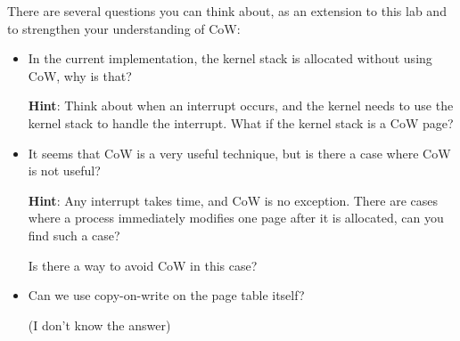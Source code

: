 There are several questions you can think about, as an extension to this lab and to
strengthen your understanding of CoW:

\begin{itemize}
    \item In the current implementation, the kernel stack is allocated without
          using CoW, why is that?

          \textbf{Hint}: Think about when an interrupt occurs, and the kernel
          needs to use the kernel stack to handle the interrupt. What if the
          kernel stack is a CoW page?

    \item It seems that CoW is a very useful technique, but is there a case
          where CoW is not useful?

          \textbf{Hint}: Any interrupt takes time, and CoW is no exception.
          There are cases where a process immediately modifies one page after it is
          allocated, can you find such a case?

          Is there a way to avoid CoW in this case?

    \item Can we use copy-on-write on the page table itself?

          (I don't know the answer)
\end{itemize}
